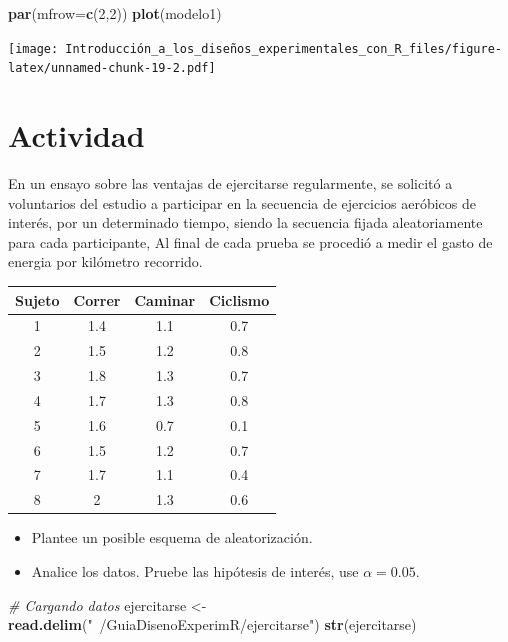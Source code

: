 \documentclass[]{book}
\newenvironment{Shaded}{\begin{snugshade}}{\end{snugshade}}
\newcommand{\KeywordTok}[1]{\textcolor[rgb]{0.13,0.29,0.53}{\textbf{#1}}}
\newcommand{\DataTypeTok}[1]{\textcolor[rgb]{0.13,0.29,0.53}{#1}}
\newcommand{\DecValTok}[1]{\textcolor[rgb]{0.00,0.00,0.81}{#1}}
\newcommand{\StringTok}[1]{\textcolor[rgb]{0.31,0.60,0.02}{#1}}
\newcommand{\CommentTok}[1]{\textcolor[rgb]{0.56,0.35,0.01}{\textit{#1}}}
\newcommand{\NormalTok}[1]{#1}
\providecommand{\tightlist}{%
  \setlength{\itemsep}{0pt}\setlength{\parskip}{0pt}}
\begin{document}
\begin{Shaded}
\begin{Highlighting}[]
\KeywordTok{par}\NormalTok{(}\DataTypeTok{mfrow=}\KeywordTok{c}\NormalTok{(}\DecValTok{2}\NormalTok{,}\DecValTok{2}\NormalTok{))}
\KeywordTok{plot}\NormalTok{(modelo1)}
\end{Highlighting}
\end{Shaded}

\texttt{[image: Introducción\_a\_los\_diseños\_experimentales\_con\_R\_files/figure-latex/unnamed-chunk-19-2.pdf]}

\section{Actividad}\label{actividad-3}

En un ensayo sobre las ventajas de ejercitarse regularmente, se solicitó
a voluntarios del estudio a participar en la secuencia de ejercicios
aeróbicos de interés, por un determinado tiempo, siendo la secuencia
fijada aleatoriamente para cada participante, Al final de cada prueba se
procedió a medir el gasto de energia por kilómetro recorrido.

\begin{longtable}[]{@{}cccc@{}}
\toprule
Sujeto & Correr & Caminar & Ciclismo\tabularnewline
\midrule
\endhead
1 & 1.4 & 1.1 & 0.7\tabularnewline
2 & 1.5 & 1.2 & 0.8\tabularnewline
3 & 1.8 & 1.3 & 0.7\tabularnewline
4 & 1.7 & 1.3 & 0.8\tabularnewline
5 & 1.6 & 0.7 & 0.1\tabularnewline
6 & 1.5 & 1.2 & 0.7\tabularnewline
7 & 1.7 & 1.1 & 0.4\tabularnewline
8 & 2 & 1.3 & 0.6\tabularnewline
\bottomrule
\end{longtable}

\begin{itemize}
\tightlist
\item
  Plantee un posible esquema de aleatorización.\\
\item
  Analice los datos. Pruebe las hipótesis de interés, use
  \(\alpha=0.05\).
\end{itemize}

\begin{Shaded}
\begin{Highlighting}[]
\CommentTok{# Cargando datos}
\NormalTok{ejercitarse <-}\StringTok{ }\KeywordTok{read.delim}\NormalTok{(}\StringTok{"~/GuiaDisenoExperimR/ejercitarse"}\NormalTok{)}
\KeywordTok{str}\NormalTok{(ejercitarse)}
\end{Highlighting}
\end{Shaded}
\end{document}
